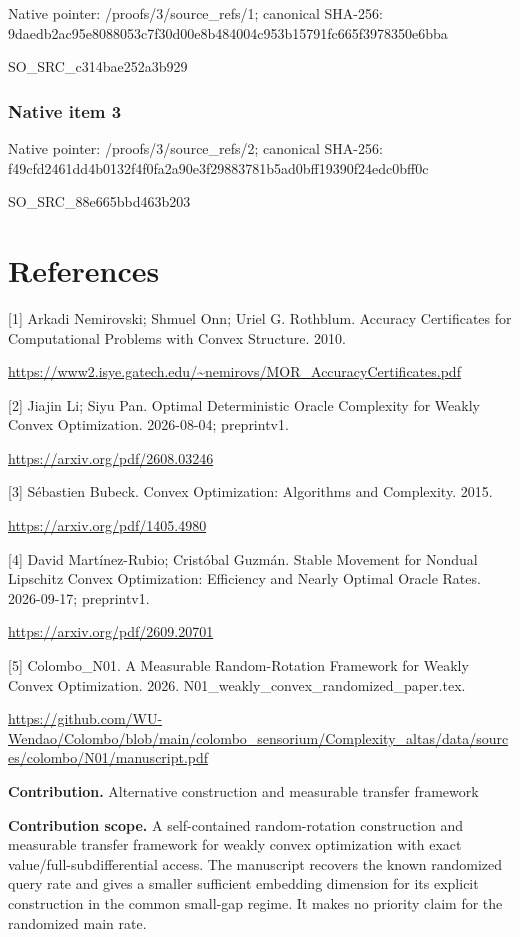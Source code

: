 \documentclass[10pt,a4paper]{article}
\begin{document}
Native pointer: /proofs/3/source\_refs/1; canonical SHA-256: 9daedb2ac95e8088053c7f30\allowbreak{}d00e8b484004c953b15791fc\allowbreak{}665f3978350e6bba


SO\_SRC\_c314bae252a3b929


\subsubsection{Native item 3}


Native pointer: /proofs/3/source\_refs/2; canonical SHA-256: f49cfd2461dd4b0132f4f0fa\allowbreak{}2a90e3f29883781b5ad0bff1\allowbreak{}9390f24edc0bff0c


SO\_SRC\_88e665bbd463b203


\section{References}


[1] Arkadi Nemirovski; Shmuel Onn; Uriel G. Rothblum. Accuracy Certificates for Computational Problems with Convex Structure. 2010.



\url{https://www2.isye.gatech.edu/~nemirovs/MOR_AccuracyCertificates.pdf}



[2] Jiajin Li; Siyu Pan. Optimal Deterministic Oracle Complexity for Weakly Convex Optimization. 2026-08-04; preprintv1.



\url{https://arxiv.org/pdf/2608.03246}



[3] Sébastien Bubeck. Convex Optimization: Algorithms and Complexity. 2015.



\url{https://arxiv.org/pdf/1405.4980}



[4] David Martínez-Rubio; Cristóbal Guzmán. Stable Movement for Nondual Lipschitz Convex Optimization: Efficiency and Nearly Optimal Oracle Rates. 2026-09-17; preprintv1.



\url{https://arxiv.org/pdf/2609.20701}



[5] Colombo\_N01. A Measurable Random-Rotation Framework for Weakly Convex Optimization. 2026. N01\_weakly\_convex\_randomized\_paper.tex.



\url{https://github.com/WU-Wendao/Colombo/blob/main/colombo_sensorium/Complexity_altas/data/sources/colombo/N01/manuscript.pdf}



\textbf{Contribution.} Alternative construction and measurable transfer framework



\textbf{Contribution scope.} A self-contained random-rotation construction and measurable transfer framework for weakly convex optimization with exact value/full-subdifferential access. The manuscript recovers the known randomized query rate and gives a smaller sufficient embedding dimension for its explicit construction in the common small-gap regime. It makes no priority claim for the randomized main rate.
\end{document}
